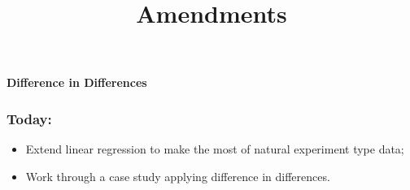 \documentclass[aspectratio=169]{beamer}
\title{Amendments}
\date{}
\theoremstyle{principle}
\begin{document}


{
  \begin{frame}[plain]
  
\begin{mdframed}[tikzsetting={draw=white,fill=white,fill opacity=0.6,draw opacity=0.4,
               line width=0pt},backgroundcolor=none,leftmargin=20,
               rightmargin=20,innertopmargin=4pt]
\begin{center}
\Huge \textbf{Difference in Differences}
\end{center}
\end{mdframed}

  \end{frame}
}


%

\begin{frame}
\frametitle{Today:}

\begin{itemize}
\item Extend linear regression to make the most of natural experiment type data;
\bigskip
\bigskip
\bigskip

\item Work through a case study applying difference in differences.

\end{itemize}

\end{frame}
\end{document}

